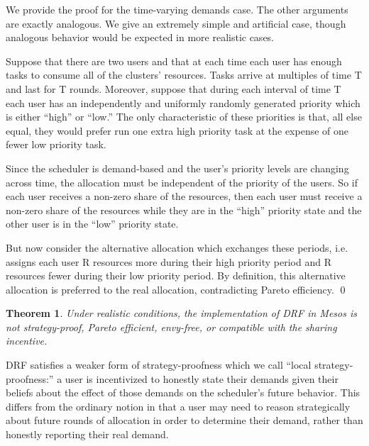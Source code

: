 \documentclass{acm_proc_article-sp}
\newtheorem{theorem}{Theorem}[section]
\newenvironment{pproof}[1][Proof]{\begin{trivlist}
\item[\hskip \labelsep {\bfseries #1}]}{\end{trivlist}}
\begin{document}
\begin{pproof}
We provide the proof for the time-varying demands case. The other arguments are exactly analogous. We give an extremely simple and artificial case, though analogous behavior would be expected in more realistic cases.

Suppose that there are two users and that at each time each user has enough tasks to consume all of the clusters' resources. Tasks arrive at multiples of time T and last for T rounds. Moreover, suppose that during each interval of time T each user has an independently and uniformly randomly generated priority which is either ``high'' or ``low.'' The only characteristic of these priorities is that, all else equal, they would prefer run one extra high priority task at the expense of one fewer low priority task.

Since the scheduler is demand-based and the user's priority levels are changing across time, the allocation must be independent of the priority of the users. So if each user receives a non-zero share of the resources, then each user must receive a non-zero share of the resources while they are in the ``high'' priority state and the other user is in the ``low'' priority state. 

But now consider the alternative allocation which exchanges these periods, i.e. assigns each user R resources more during their high priority period and R resources fewer during their low priority period. By definition, this alternative allocation is preferred to the real allocation, contradicting Pareto efficiency.
\qed
\end{pproof}
\vspace{-5mm}
\begin{theorem}
Under realistic conditions, the implementation of DRF in Mesos is not strategy-proof, Pareto efficient, envy-free, or compatible with the sharing incentive. 
\end{theorem}
\vspace{-5mm}
DRF satisfies a weaker form of strategy-proofness which we call ``local strategy-proofness:'' 
a user is incentivized to honestly state their demands given their beliefs about the effect of those demands on the scheduler's future behavior. 
This differs from the ordinary notion in that a user may need to reason strategically about future rounds of allocation in order to determine
their demand, rather than honestly reporting their real demand.
\end{document}
